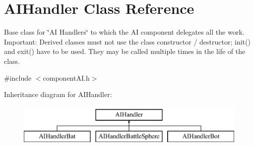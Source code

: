 \hypertarget{classAIHandler}{
\section{\-A\-I\-Handler \-Class \-Reference}
\label{d0/d2d/classAIHandler}
}


\-Base class for \char`\"{}\-A\-I Handlers\char`\"{} to which the \-A\-I component delegates all the work. \-Important\-: \-Derived classes must not use the class constructor / destructor; init() and exit() have to be used. \-They may be called multiple times in the life of the class.  




{\ttfamily \#include $<$component\-A\-I.\-h$>$}

\-Inheritance diagram for \-A\-I\-Handler\-:\begin{figure}[H]
\begin{center}
\leavevmode
\includegraphics[height=2.000000cm]{d0/d2d/classAIHandler}
\end{center}
\end{figure}

